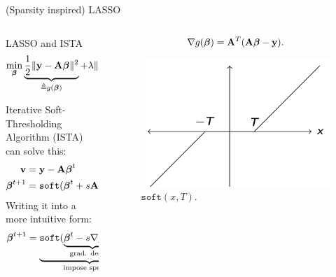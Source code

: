 \documentclass[aspectratio=43, 10pt]{beamer}
\begin{document}
\begin{frame}{(Sparsity inspired) LASSO}
    \vspace{-4mm}
    \begin{columns}
        \begin{column}{0.66\textwidth}
            \begin{block}{LASSO and ISTA}
            $$\min_{\boldsymbol{\beta}} \underbrace{\frac{1}{2}\| \bold{y} - \bold{A} \boldsymbol{\beta} \|^2}_{\triangleq g(\boldsymbol{\beta})} + \lambda \| \boldsymbol{\beta} \|_1. \notag$$
    
        Iterative Soft-Thresholding Algorithm (ISTA) can solve this: 
            \begin{align}
                \bold{v} &= \bold{y} - \bold{A} \boldsymbol{\beta}^t \notag \\ 
                \boldsymbol{\beta}^{t+1} &= \texttt{soft}(\boldsymbol{\beta}^{t}+s\bold{A}^T \boldsymbol{v}^{t}; s\lambda). \notag 
            \end{align}
            Writing it into a more intuitive form: 
            \begin{equation}
                \boldsymbol{\beta}^{t+1} = \underbrace{\texttt{soft}( \underbrace{\boldsymbol{\beta}^{t} - s\nabla g(\boldsymbol{\beta^{t}})}_{\text{grad. descent}}; s\lambda)}_{\text{impose sparsity}}. \notag
            \end{equation}
            \end{block}
        \end{column}
        
        \begin{column}{0.3\textwidth}
            $$\nabla g(\boldsymbol{\beta}) = \bold{A}^T (\bold{A} \boldsymbol{\beta} - \bold{y}).$$

            \vspace{-3mm}
            \begin{figure}
                \centering
                \includegraphics[width=0.9\linewidth]{figures/ST_function.png}
                \caption{$\texttt{soft}(x,T)$.}
            \end{figure}


\end{column}
\end{columns}
\end{frame}
\end{document}
